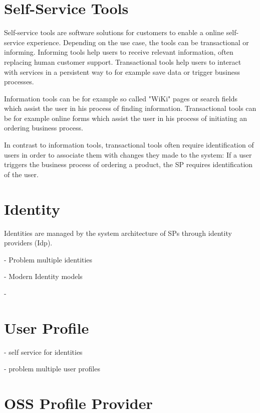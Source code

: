 \documentclass[
     12pt,         %
     a4paper,      %
     BCOR=10mm,version=first,     %
     DIV=14,version=first,        %
     ]{scrreprt}
\begin{document}
\section{Self-Service Tools}
Self-service tools are software solutions for customers to enable a online self-service experience. Depending on the use case, the tools can be transactional or informing. Informing tools help users to receive relevant information, often replacing human customer support. Transactional tools help users to interact with services in a persistent way to for example save data or trigger business processes.

Information tools can be for example so called "WiKi" pages or search fields which assist the user in his process of finding information. Transactional tools can be for example online forms which assist the user in his process of initiating an ordering business process.

In contrast to information tools, transactional tools often require identification of users in order to associate them with changes they made to the system: If a user triggers the business process of ordering a product, the SP requires identification of the user.

\section{Identity}


Identities are managed by the system architecture of SPs through identity providers (Idp).

- Problem multiple identities

- Modern Identity models

- 

\section{User Profile}

- self service for identities

- problem multiple user profiles


\section{}

\section{OSS Profile Provider}
\end{document}

